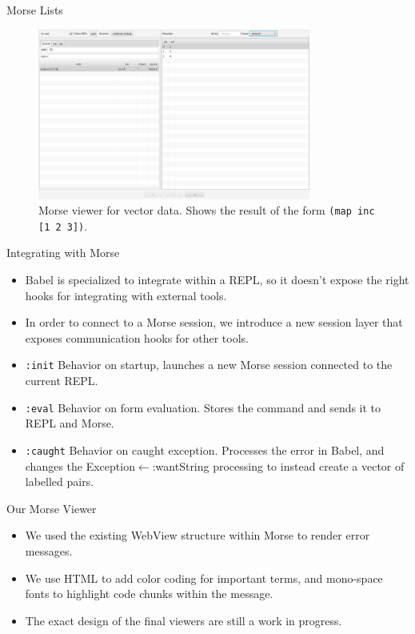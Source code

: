 \documentclass{beamer}
\begin{document}
\begin{frame}{Morse Lists}
  \begin{figure}
    \centering
    \includegraphics[width=0.8\textwidth]{../resources/MorseSuccessfulForm.png}
    \caption{Morse viewer for vector data. Shows the result of the form \texttt{(map inc [1 2 3])}.}
    \label{fig:MorseVec}
  \end{figure}
\end{frame}


\begin{frame}{Integrating with Morse}
  \begin{itemize}
    \item<1-> Babel is specialized to integrate within a REPL, so it doesn't expose the right hooks for integrating with external tools.
    \item<2-> In order to connect to a Morse session, we introduce a new session layer that exposes communication hooks for other tools.
    \item<3-> \texttt{:init} Behavior on startup, launches a new Morse session connected to the current REPL.
    \item<4-> \texttt{:eval} Behavior on form evaluation. Stores the command and sends it to REPL and Morse.
    \item<5-> \texttt{:caught} Behavior on caught exception. Processes the error in Babel, and changes the Exception$\leftarrow$:wantString processing to instead create a vector of labelled pairs.  
  \end{itemize}
\end{frame}

\begin{frame}{Our Morse Viewer}
  \begin{itemize}
  \item<1-> We used the existing WebView structure within Morse to render error messages.
  \item<2-> We use HTML to add color coding for important terms, and mono-space fonts to highlight code chunks within the message.
  \item<3-> The exact design of the final viewers are still a work in progress.
  \end{itemize}
\end{frame}
\end{document}
